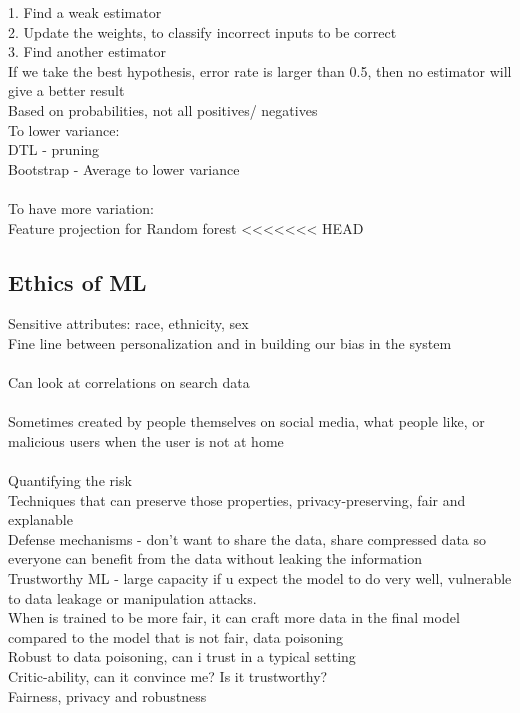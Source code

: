 \documentclass[11pt]{article}
\begin{document}
1. Find a weak estimator
\\2. Update the weights, to classify incorrect inputs to be correct
\\3. Find another estimator
\\
If we take the best hypothesis, error rate is larger than 0.5, then no estimator will give a better result
\\
Based on probabilities, not all positives/ negatives\\
To lower variance: \\
DTL - pruning\\
Bootstrap - Average to lower variance\\
\\
To have more variation: \\
Feature projection for Random forest
<<<<<<< HEAD
\subsection{Ethics of ML}
Sensitive attributes: race, ethnicity, sex\\
Fine line between personalization and in building our bias in the system\\\\
Can look at correlations on search data\\
\\
Sometimes created by people themselves on social media, what people like, or malicious users when the user is not at home\\\\
Quantifying the risk\\
Techniques that can preserve those properties, privacy-preserving, fair and explanable\\
Defense mechanisms - don't want to share the data, share compressed data so everyone can benefit from the data without leaking the information
\\
Trustworthy ML - large capacity if u expect the model to do very well, vulnerable to data leakage or manipulation attacks. 
\\
When is trained to be more fair, it can craft more data in the final model compared to the model that is not fair, data poisoning 
\\
Robust to data poisoning, can i trust in a typical setting\\
Critic-ability, can it convince me? Is it trustworthy?\\
Fairness, privacy and robustness\\\\
\end{document}
